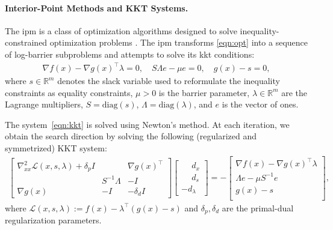 \documentclass{article}
\begin{document}
\paragraph{Interior-Point Methods and KKT Systems.}
The \gls*{ipm} is a class of optimization algorithms designed to solve inequality-constrained optimization problems \cite{nocedalNumericalOptimization2006}. The \gls*{ipm} transforms \cref{eqn:opt} into a sequence of log-barrier subproblems and attempts to solve its \gls*{kkt} conditions:
\begin{align}\label{eqn:kkt}
  \nabla f(x) - \nabla g(x)^\top \lambda = 0, \quad
  S \Lambda e - \mu e = 0, \quad
  g(x) - s = 0,
\end{align}
where $s \in \mathbb{R}^m$ denotes the slack variable used to reformulate the inequality constraints as equality constraints, $\mu > 0$ is the barrier parameter, $\lambda \in \mathbb{R}^m$ are the Lagrange multipliers, $S = \text{diag}(s)$, $\Lambda = \text{diag}(\lambda)$, and $e$ is the vector of ones.

The system~\cref{eqn:kkt} is solved using Newton's method. At each iteration, we obtain the search direction by solving the following (regularized and symmetrized) KKT system:
\begin{align}\label{eqn:kkt_system}
  \begin{bmatrix}
    \nabla^2_{x x} \mathcal{L}(x,s,\lambda) + \delta_p I & & \nabla g(x)^\top
    \\ & S^{-1}\Lambda &  -I
    \\ \nabla g(x) & -I &  - \delta_d I
  \end{bmatrix}
  \begin{bmatrix}
    \phantom{-}d_x \\
    \phantom{-}d_s \\
    -d_\lambda
  \end{bmatrix} =
  -\begin{bmatrix}
    \nabla f(x) - \nabla g(x)^\top \lambda\\
    \Lambda e - \mu S^{-1}e \\
    g(x) - s\\
  \end{bmatrix},
\end{align}
where $\mathcal{L}(x,s,\lambda) := f(x) - \lambda^\top (g(x)-s)$ and $\delta_p, \delta_d $ are the primal-dual regularization parameters. 
\end{document}
